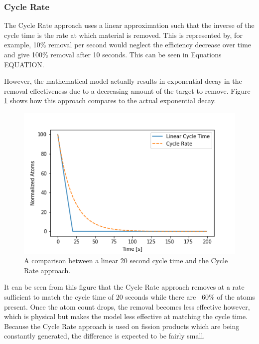 \subsubsection{Cycle Rate}

The Cycle Rate approach uses a linear approximation such that the inverse of the cycle time is the rate at which material is removed. This is represented by, for example, 10\% removal per second would neglect the efficiency decrease over time and give 100\% removal after 10 seconds. This can be seen in Equations EQUATION.



However, the mathematical model actually results in exponential decay in the removal effectiveness due to a decreasing amount of the target to remove. Figure \ref{fig:cr_examp} shows how this approach compares to the actual exponential decay.

\begin{figure}[H]
  \centering
  \includegraphics[scale=0.6]{images/Cycle_Rate_example_0.png}
  \caption{A comparison between a linear 20 second cycle time and the Cycle Rate approach.}
   \label{fig:cr_examp}
\end{figure}

It can be seen from this figure that the Cycle Rate approach removes at a rate sufficient to match the cycle time of 20 seconds while there are ~60\% of the atoms present. Once the atom count drops, the removal becomes less effective however, which is physical but makes the model less effective at matching the cycle time. Because the Cycle Rate approach is used on fission products which are being constantly generated, the difference is expected to be fairly small.

